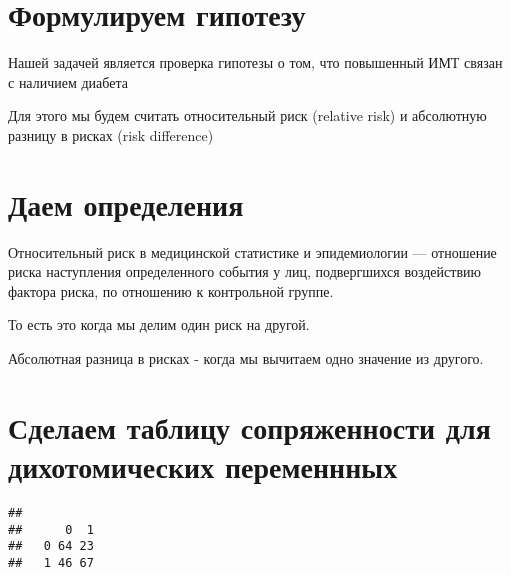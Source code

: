 \documentclass[
]{article}
\newenvironment{Shaded}{\begin{snugshade}}{\end{snugshade}}
\newcommand{\CommentTok}[1]{\textcolor[rgb]{0.56,0.35,0.01}{\textit{#1}}}
\newcommand{\FunctionTok}[1]{\textcolor[rgb]{0.13,0.29,0.53}{\textbf{#1}}}
\newcommand{\NormalTok}[1]{#1}
\newcommand{\OtherTok}[1]{\textcolor[rgb]{0.56,0.35,0.01}{#1}}
\newcommand{\SpecialCharTok}[1]{\textcolor[rgb]{0.81,0.36,0.00}{\textbf{#1}}}
\begin{document}
\section{Формулируем
гипотезу}\label{ux444ux43eux440ux43cux443ux43bux438ux440ux443ux435ux43c-ux433ux438ux43fux43eux442ux435ux437ux443}

Нашей задачей является проверка гипотезы о том, что повышенный ИМТ
связан с наличием диабета

Для этого мы будем считать относительный риск (relative risk) и
абсолютную разницу в рисках (risk difference)

\section{Даем
определения}\label{ux434ux430ux435ux43c-ux43eux43fux440ux435ux434ux435ux43bux435ux43dux438ux44f}

Относительный риск в медицинской статистике и эпидемиологии ---
отношение риска наступления определенного события у лиц, подвергшихся
воздействию фактора риска, по отношению к контрольной группе.

То есть это когда мы делим один риск на другой.

Абсолютная разница в рисках - когда мы вычитаем одно значение из
другого.

\section{Сделаем таблицу сопряженности для дихотомических
переменнных}\label{ux441ux434ux435ux43bux430ux435ux43c-ux442ux430ux431ux43bux438ux446ux443-ux441ux43eux43fux440ux44fux436ux435ux43dux43dux43eux441ux442ux438-ux434ux43bux44f-ux434ux438ux445ux43eux442ux43eux43cux438ux447ux435ux441ux43aux438ux445-ux43fux435ux440ux435ux43cux435ux43dux43dux43dux44bux445}

\begin{Shaded}
\end{Shaded}

\begin{verbatim}
##    
##      0  1
##   0 64 23
##   1 46 67
\end{verbatim}
\end{document}
